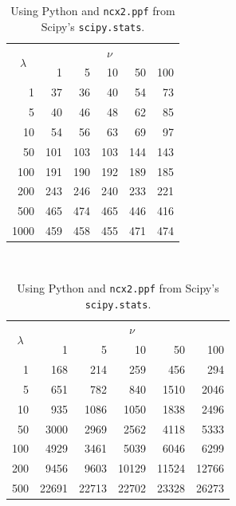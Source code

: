 \documentclass[11pt,a4paper,twoside,english]{extarticle}
\begin{document}
\begin{table}[htb]
    \centering
    \hfill
    \noindent
    \begin{subtable}[t]{0.4\linewidth}
    \centering    
    \begin{tabular}{|r|rrrrr|}
    \multicolumn{1}{c}{\multirow{2}{*}{$ \lambda $}} & \multicolumn{5}{c}{$ \nu $} \\
    \cline{2-6}
    \multicolumn{1}{c|}{} & 1 &   5  &  10 &  50  & 100 \\
    \hline
    1    &  37 &  36 &  40 &  54 &  73\\
    5    &  40 &  46 &  48 &  62 &  85\\
    10   &  54 &  56 &  63 &  69 &  97\\
    50   & 101 & 103 & 103 & 144 & 143\\
    100  & 191 & 190 & 192 & 189 & 185\\
    200  & 243 & 246 & 240 & 233 & 221\\
    500  & 465 & 474 & 465 & 446 & 416\\
    1000 & 459 & 458 & 455 & 471 & 474 \\
    \hline
\end{tabular}\\[1em]
\begin{minipage}[t]{0.9\linewidth}
\caption{Using Python and \texttt{ncx2.ppf} from Scipy's \texttt{scipy.stats}.}
\label{tab:non_central_chi_2_times_python}
\end{minipage}
\end{subtable}
\hfill
\begin{subtable}[t]{0.55\linewidth}   
    \centering     
    \begin{tabular}{|r|rrrrr|}
    \multicolumn{1}{c}{\multirow{2}{*}{$ \lambda $}} & \multicolumn{5}{c}{$ \nu $} \\
    \cline{2-6}
    \multicolumn{1}{c|}{} & 1 &   5  &  10 &  50  & 100 \\
    \hline
    1& 168 & 214 & 259 & 456 & 294  \\ 
    5& 651 & 782 & 840 & 1510 & 2046  \\ 
    10& 935 & 1086 & 1050 & 1838 & 2496  \\ 
    50& 3000 & 2969 & 2562 & 4118 & 5333  \\ 
    100& 4929 & 3461 & 5039 & 6046 & 6299  \\ 
    200& 9456 & 9603 & 10129 & 11524 & 12766  \\ 
    500& 22691 & 22713 & 22702 & 23328 & 26273  \\ 

\end{tabular}
\end{subtable}
\end{table}
\end{document}
